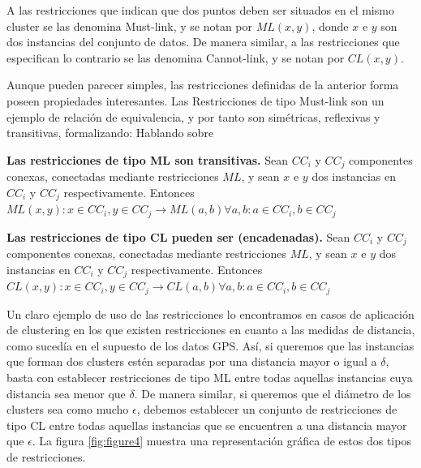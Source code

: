 A las restricciones que indican que dos puntos deben ser situados en el mismo cluster se las denomina Must-link, y se notan por $ML(x,y)$, donde $x$ e $y$ son dos instancias del conjunto de datos. De manera similar, a las restricciones que especifican lo contrario se las denomina Cannot-link, y se notan por $CL(x,y)$.

Aunque pueden parecer simples, las restricciones definidas de la anterior forma poseen propiedades interesantes. Las Restricciones de tipo Must-link son un ejemplo de relación de equivalencia, y por tanto son simétricas, reflexivas y transitivas, formalizando: Hablando sobre

\begin{observacion}
	\textbf{Las restricciones de tipo ML son transitivas.} Sean $CC_i$ y $CC_j$ componentes conexas, conectadas mediante restricciones $ML$, y sean $x$ e $y$ dos instancias en $CC_i$ y $CC_j$ respectivamente. Entonces $ML(x,y): x \in CC_i, y \in CC_j \rightarrow ML(a,b) \forall a,b: a\in CC_i, b \in CC_j$
\end{observacion}



\begin{observacion}
	\textbf{Las restricciones de tipo CL pueden ser (encadenadas).} Sean $CC_i$ y $CC_j$ componentes conexas, conectadas mediante restricciones $ML$, y sean $x$ e $y$ dos instancias en $CC_i$ y $CC_j$ respectivamente. Entonces $CL(x,y): x \in CC_i, y \in CC_j \rightarrow CL(a,b) \forall a,b: a\in CC_i, b \in CC_j$
\end{observacion}

Un claro ejemplo de uso de las restricciones lo encontramos en casos de aplicación de clustering en los que existen restricciones en cuanto a las medidas de distancia, como sucedía en el supuesto de los datos GPS. Así, si queremos que las instancias que forman dos clusters estén separadas por una distancia mayor o igual a $\delta$, basta con establecer restricciones de tipo ML entre todas aquellas instancias cuya distancia sea menor que $\delta$. 
De manera similar, si queremos que el diámetro de los clusters sea como mucho $\epsilon$, debemos establecer un conjunto de restricciones de tipo CL entre todas aquellas instancias que se encuentren a una distancia mayor que $\epsilon$. La figura \ref{fig:figure4} muestra una representación gráfica de estos dos tipos de restricciones.

